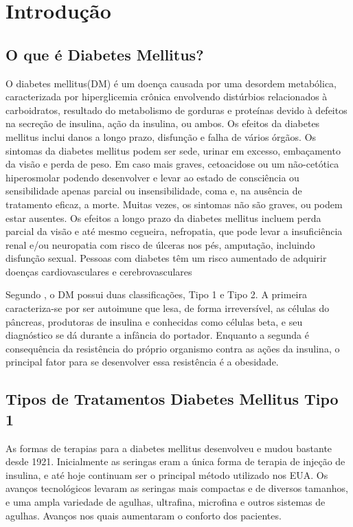 \chapter{Introdução}
\section{O que é Diabetes Mellitus?}
O diabetes mellitus(DM) é um doença causada por uma desordem metabólica, caracterizada por hiperglicemia crônica envolvendo distúrbios relacionados à carboidratos, resultado do metabolismo de gorduras e proteínas devido à defeitos na secreção de insulina, ação da insulina, ou ambos. Os efeitos da diabetes mellitus inclui danos a longo prazo, disfunção e falha de vários órgãos. Os sintomas da diabetes mellitus podem ser sede, urinar em excesso, embaçamento da visão e perda de peso. Em caso mais graves, cetoacidose ou um não-cetótica hiperosmolar podendo desenvolver e levar ao estado de consciência ou sensibilidade apenas parcial ou insensibilidade, coma e, na ausência de tratamento eficaz, a morte. Muitas vezes, os sintomas não são graves, ou podem estar ausentes. Os efeitos a longo prazo da diabetes mellitus incluem perda parcial da visão e até mesmo cegueira, nefropatia, que pode levar a insuficiência renal e/ou neuropatia com risco de úlceras nos pés, amputação, incluindo disfunção sexual. Pessoas com diabetes têm um risco aumentado de adquirir doenças cardiovasculares e cerebrovasculares \cite{alberti1998definition}

Segundo \cite{alberti1998definition}, o DM possui duas classificações, Tipo 1 e Tipo 2. A primeira caracteriza-se por ser autoimune que lesa, de forma irreversível, as células do pâncreas, produtoras de insulina e conhecidas como células beta, e seu diagnóstico se dá durante a infância do portador. Enquanto a segunda é consequência da resistência do próprio organismo contra as ações da insulina, o principal fator para se desenvolver essa resistência é a obesidade.

\section{Tipos de Tratamentos Diabetes Mellitus Tipo 1}

As formas de terapias para a diabetes mellitus desenvolveu e mudou bastante desde 1921. Inicialmente as seringas eram a única forma de terapia de injeção de insulina, e até hoje continuam ser o principal método utilizado nos EUA. Os avanços tecnológicos levaram as seringas mais compactas e de diversos tamanhos, e uma ampla variedade de agulhas, ultrafina, microfina e outros sistemas de agulhas. Avanços nos quais aumentaram o conforto dos pacientes.

